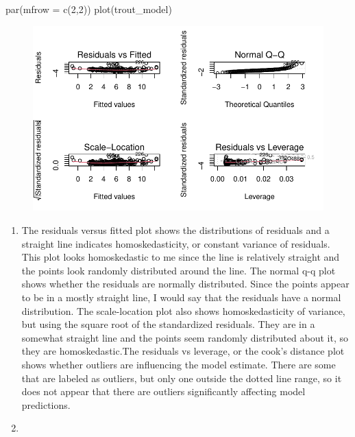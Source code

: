 \documentclass[
  letterpaper,
  DIV=11,
  numbers=noendperiod]{scrartcl}
\newenvironment{Shaded}{\begin{snugshade}}{\end{snugshade}}
\newcommand{\AttributeTok}[1]{\textcolor[rgb]{0.40,0.45,0.13}{#1}}
\newcommand{\DecValTok}[1]{\textcolor[rgb]{0.68,0.00,0.00}{#1}}
\newcommand{\FunctionTok}[1]{\textcolor[rgb]{0.28,0.35,0.67}{#1}}
\newcommand{\NormalTok}[1]{\textcolor[rgb]{0.00,0.23,0.31}{#1}}
\begin{document}
\begin{Shaded}
\begin{Highlighting}[]
\FunctionTok{par}\NormalTok{(}\AttributeTok{mfrow =} \FunctionTok{c}\NormalTok{(}\DecValTok{2}\NormalTok{,}\DecValTok{2}\NormalTok{))}
\FunctionTok{plot}\NormalTok{(trout\_model)}
\end{Highlighting}
\end{Shaded}

\begin{figure}[H]

{\centering \includegraphics{ENVS-193DS-Homework-4_files/figure-pdf/unnamed-chunk-4-1.pdf}

}

\end{figure}

\begin{enumerate}
\def\labelenumi{\arabic{enumi}.}
\setcounter{enumi}{4}
\item
  The residuals versus fitted plot shows the distributions of residuals
  and a straight line indicates homoskedasticity, or constant variance
  of residuals. This plot looks homoskedastic to me since the line is
  relatively straight and the points look randomly distributed around
  the line. The normal q-q plot shows whether the residuals are normally
  distributed. Since the points appear to be in a mostly straight line,
  I would say that the residuals have a normal distribution. The
  scale-location plot also shows homoskedasticity of variance, but using
  the square root of the standardized residuals. They are in a somewhat
  straight line and the points seem randomly distributed about it, so
  they are homoskedastic.The residuals vs leverage, or the cook's
  distance plot shows whether outliers are influencing the model
  estimate. There are some that are labeled as outliers, but only one
  outside the dotted line range, so it does not appear that there are
  outliers significantly affecting model predictions.
\item
\end{enumerate}
\end{document}
